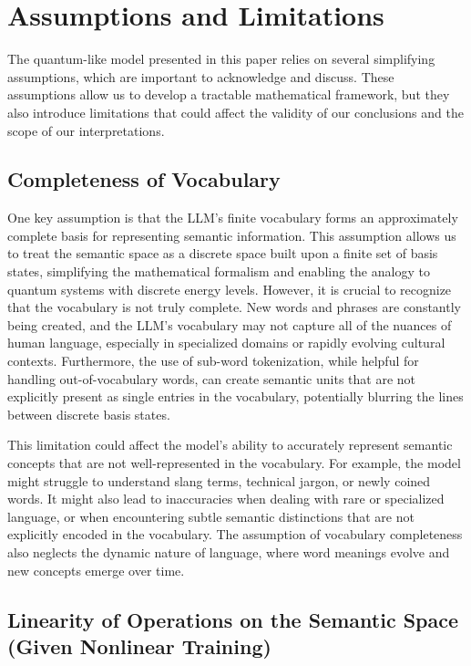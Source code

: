 \documentclass[prd,amsmath,amssymb,12pt]{revtex4}
\begin{document}
\section{Assumptions and Limitations}

The quantum-like model presented in this paper relies on several simplifying
assumptions, which are important to acknowledge and discuss. These assumptions
allow us to develop a tractable mathematical framework, but they also introduce
limitations that could affect the validity of our conclusions and the scope
of our interpretations.

\subsection{Completeness of Vocabulary}

One key assumption is that the LLM's finite vocabulary forms an approximately
complete basis for representing semantic information. This assumption allows
us to treat the semantic space as a discrete space built upon a finite set
of basis states, simplifying the mathematical formalism and enabling the
analogy to quantum systems with discrete energy levels. However, it is
crucial to recognize that the vocabulary is not truly complete. New words
and phrases are constantly being created, and the LLM's vocabulary may not
capture all of the nuances of human language, especially in specialized
domains or rapidly evolving cultural contexts. Furthermore, the use of
sub-word tokenization, while helpful for handling out-of-vocabulary words,
can create semantic units that are not explicitly present as single
entries in the vocabulary, potentially blurring the lines between
discrete basis states.

This limitation could affect the model's ability to accurately represent
semantic concepts that are not well-represented in the vocabulary. For example,
the model might struggle to understand slang terms, technical jargon, or newly
coined words. It might also lead to inaccuracies when dealing with rare or
specialized language, or when encountering subtle semantic distinctions
that are not explicitly encoded in the vocabulary. The assumption of
vocabulary completeness also neglects the dynamic nature of language,
where word meanings evolve and new concepts emerge over time.

\subsection{Linearity of Operations on the Semantic Space
(Given Nonlinear Training)}
\end{document}
